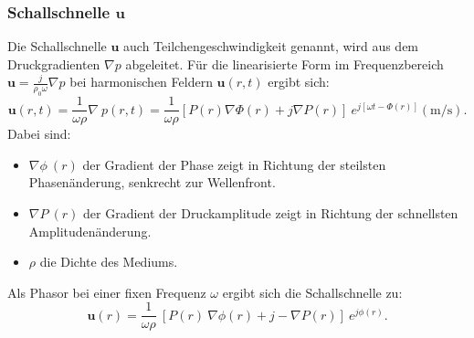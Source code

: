 \subsubsection{Schallschnelle $\boldsymbol{u}$}
 
Die Schallschnelle $\boldsymbol{u}$ auch Teilchengeschwindigkeit genannt, wird aus dem Druckgradienten $\nabla p$ abgeleitet. Für die linearisierte Form im Frequenzbereich $\boldsymbol{u} = \frac{j}{\rho_0 \omega} \nabla p$ bei harmonischen Feldern $\boldsymbol{u}(r,t)$ ergibt sich:
\begin{equation}
\boldsymbol{u}(r,t) = \frac{1}{\omega \rho} \nabla \: p(r,t) = \frac{1}{\omega \rho} [ P(r) \nabla \Phi(r) + j\nabla P(r) ] \: e^{j[\omega t -\Phi(r)]} (\si{\metre / \second}).
\end{equation}
Dabei sind:
\begin{itemize}
\item $\nabla \phi \: (r)$ der Gradient der Phase zeigt in Richtung der steilsten Phasenänderung, senkrecht zur Wellenfront.
\item $\nabla P \:(r)$ der Gradient der Druckamplitude zeigt in Richtung der schnellsten Amplitudenänderung.
\item $\rho$ die Dichte des Mediums.
\end{itemize}
Als Phasor bei einer fixen Frequenz $\omega$ ergibt sich die Schallschnelle zu:
\begin{equation}
\boldsymbol{u}(r) = \frac{1}{\omega \rho} \: [ P(r) \: \nabla \phi(r) + j - \nabla P(r) ] \: e^{j\phi (r)}.
\label{helmholtz:PhasorSchallschnelle}
\end{equation}
 
 
 
 
 
